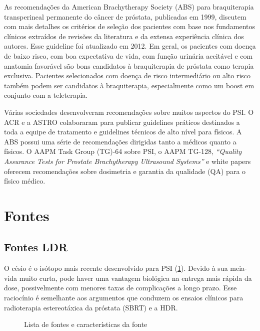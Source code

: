 \documentclass[11pt,a4paper]{article}
\begin{document}
	As recomendações da American Brachytherapy Society (ABS) para braquiterapia transperineal permanente do câncer de próstata, publicadas em 1999, discutem com mais detalhes os critérios de seleção dos pacientes com base nos fundamentos clínicos extraídos de revisões da literatura e da extensa experiência clínica dos autores. Esse guideline foi atualizado em 2012. Em geral, os pacientes com doença de baixo risco, com boa expectativa de vida, com função urinária aceitável e com anatomia favorável são bons candidatos à braquiterapia de próstata como terapia exclusiva. Pacientes selecionados com doença de risco intermediário ou alto risco também podem ser candidatos à braquiterapia, especialmente como um boost em conjunto com a teleterapia.

	Várias sociedades desenvolveram recomendações sobre muitos aspectos do PSI. O ACR e a ASTRO colaboraram para publicar guidelines práticos destinados a toda a equipe de tratamento e guidelines técnicos de alto nível para físicos. A ABS possui uma série de recomendações dirigidas tanto a médicos quanto a físicos. O AAPM Task Group (TG)-64 sobre PSI, o AAPM TG-128, \textit{``Quality Assurance Tests for Prostate Brachytherapy Ultrasound Systems''} e white papers oferecem recomendações sobre dosimetria e garantia da qualidade (QA) para o  físico médico.

\section{Fontes}

\subsection*{Fontes LDR}

	O césio é o isótopo mais recente desenvolvido para PSI (\ref{fig:fontesBraquiProstata}). Devido à sua meia-vida muito curta, pode haver uma vantagem biológica na entrega mais rápida da dose, possivelmente com menores taxas de complicações a longo prazo. Esse raciocínio é semelhante aos argumentos que conduzem os ensaios clínicos para radioterapia estereotáxica da próstata (SBRT) e a HDR.

	\begin{figure}[h]
		\centering
		\caption{Lista de fontes e características da fonte}
		\label{fig:fontesBraquiProstata}
	\end{figure}
\end{document}

